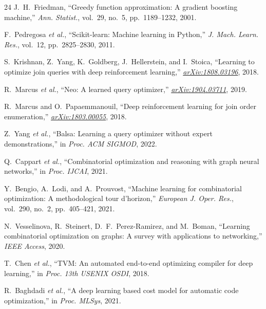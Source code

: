 \documentclass[conference]{IEEEtran}
\begin{document}
\begin{thebibliography}{24}
 J.~H.~Friedman, ``Greedy function approximation: A gradient boosting machine,'' \textit{Ann. Statist.}, vol.~29, no.~5, pp.~1189--1232, 2001.

 F.~Pedregosa \textit{et al.}, ``Scikit-learn: Machine learning in Python,'' \textit{J. Mach. Learn. Res.}, vol.~12, pp.~2825--2830, 2011.

 S.~Krishnan, Z.~Yang, K.~Goldberg, J.~Hellerstein, and I.~Stoica, ``Learning to optimize join queries with deep reinforcement learning,'' \textit{\href{https://arxiv.org/abs/1808.03196}{arXiv:1808.03196}}, 2018.

 R.~Marcus \textit{et al.}, ``Neo: A learned query optimizer,'' \textit{\href{https://arxiv.org/abs/1904.03711}{arXiv:1904.03711}}, 2019.

 R.~Marcus and O.~Papaemmanouil, ``Deep reinforcement learning for join order enumeration,'' \textit{\href{https://arxiv.org/abs/1803.00055}{arXiv:1803.00055}}, 2018.

 Z.~Yang \textit{et al.}, ``Balsa: Learning a query optimizer without expert demonstrations,'' in \textit{Proc. ACM SIGMOD}, 2022.

 Q.~Cappart \textit{et al.}, ``Combinatorial optimization and reasoning with graph neural networks,'' in \textit{Proc. IJCAI}, 2021.

 Y.~Bengio, A.~Lodi, and A.~Prouvost, ``Machine learning for combinatorial optimization: A methodological tour d'horizon,'' \textit{European J. Oper. Res.}, vol.~290, no.~2, pp.~405--421, 2021.

 N.~Vesselinova, R.~Steinert, D.~F.~Perez-Ramirez, and M.~Boman, ``Learning combinatorial optimization on graphs: A survey with applications to networking,'' \textit{IEEE Access}, 2020.

 T.~Chen \textit{et al.}, ``TVM: An automated end-to-end optimizing compiler for deep learning,'' in \textit{Proc. 13th USENIX OSDI}, 2018.

 R.~Baghdadi \textit{et al.}, ``A deep learning based cost model for automatic code optimization,'' in \textit{Proc. MLSys}, 2021.

\end{thebibliography}
\end{document}
